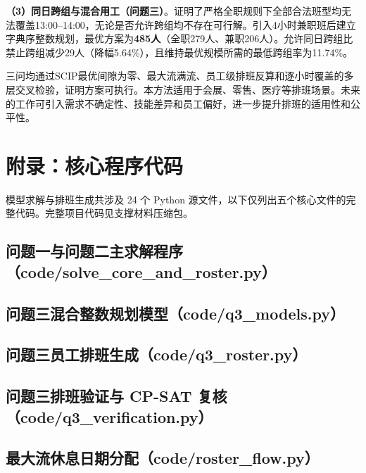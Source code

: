 \documentclass[withoutpreface,bwprint]{cumcmthesis}
\begin{document}
\textbf{（3）同日跨组与混合用工（问题三）}。证明了严格全职规则下全部合法班型均无法覆盖13:00--14:00，无论是否允许跨组均不存在可行解。引入4小时兼职班后建立字典序整数规划，最优方案为\textbf{485人}（全职279人、兼职206人）。允许同日跨组比禁止跨组减少29人（降幅5.64\%），且维持最优规模所需的最低跨组率为11.74\%。

三问均通过SCIP最优间隙为零、最大流满流、员工级排班反算和逐小时覆盖的多层交叉检验，证明方案可执行。本方法适用于会展、零售、医疗等排班场景。未来的工作可引入需求不确定性、技能差异和员工偏好，进一步提升排班的适用性和公平性。




\clearpage
\appendix
\section{附录：核心程序代码}

模型求解与排班生成共涉及 24 个 Python 源文件，以下仅列出五个核心文件的完整代码。完整项目代码见支撑材料压缩包。

\subsection{问题一与问题二主求解程序（code/solve\_core\_and\_roster.py）}



\subsection{问题三混合整数规划模型（code/q3\_models.py）}



\subsection{问题三员工排班生成（code/q3\_roster.py）}



\subsection{问题三排班验证与 CP-SAT 复核（code/q3\_verification.py）}



\subsection{最大流休息日期分配（code/roster\_flow.py）}


\end{document}
